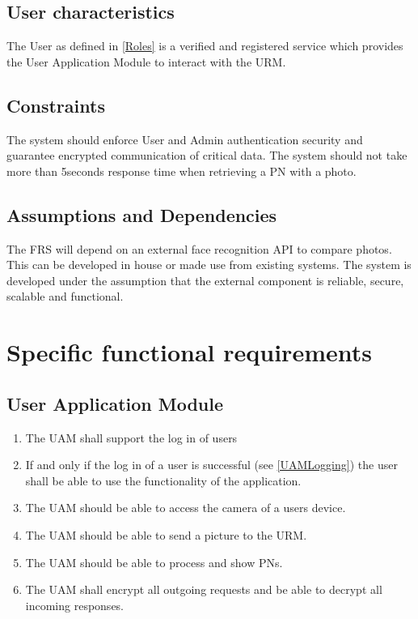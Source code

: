 \documentclass[a4paper,11pt]{article}
\begin{document}
\subsection{User characteristics}
The User as defined in \ref{Roles} is a verified and registered service which provides the User Application Module to interact with the URM.

\subsection{Constraints} \label{ReqConstraints}
The system should enforce User and Admin authentication security and guarantee encrypted communication of critical data.
The system should not take more than 5seconds response time when retrieving a PN with a photo.

\subsection{Assumptions and Dependencies}
The FRS will depend on an external face recognition API to compare photos. This can be developed in house or made use from existing systems. The system is developed under the assumption that the external component is reliable, secure, scalable and functional.

\newpage
\section{Specific functional requirements}

\subsection{User Application Module}
\begin{enumerate}[leftmargin=0.8in]
		\item \label{UAMLogging} The UAM shall support the log in of users
    \item If and only if the log in of a user is successful (see \ref{UAMLogging}) the user shall be able to use the functionality of the application.
		\item \label{UAMCAM} The UAM should be able to access the camera of a users device.
    \item \label{UAMCAM} The UAM should be able to send a picture to the URM.
    \item \label{UAMRet} The UAM should be able to process and show PNs.
		\item The UAM shall encrypt all outgoing requests and be able to decrypt all incoming responses.
\end{enumerate}
\end{document}
